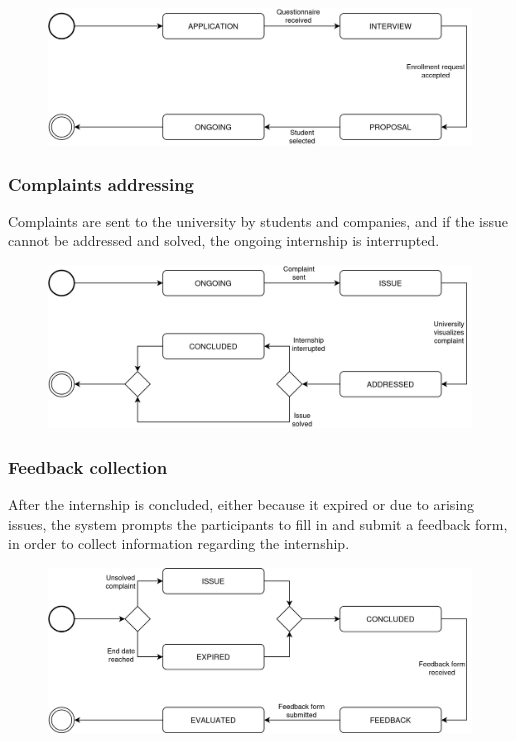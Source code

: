 \begin{figure}[H]
    \centering
    \includegraphics[width=0.8\linewidth]{../../assets/state-charts/selection-process.png}
\end{figure}

\subsubsection{Complaints addressing}

Complaints are sent to the university by students and companies, and if the issue cannot be addressed and solved, the ongoing internship is interrupted.

\begin{figure}[H]
    \centering
    \includegraphics[width=0.8\linewidth]{../../assets/state-charts/complaints-addressing.png}
\end{figure}

\subsubsection{Feedback collection}

After the internship is concluded, either because it expired or due to arising issues, the system prompts the participants to fill in and submit a feedback form, in order to collect information regarding the internship.

\begin{figure}[H]
    \centering
    \includegraphics[width=0.8\linewidth]{../../assets/state-charts/feedback-collection.png}
\end{figure}

